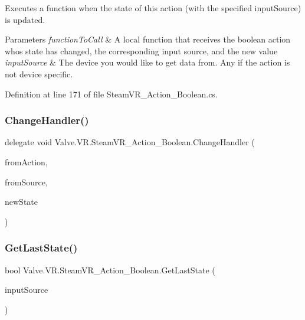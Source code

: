 Executes a function when the state of this action (with the specified input\+Source) is updated. 


\begin{DoxyParams}{Parameters}
{\em function\+To\+Call} & A local function that receives the boolean action who\textquotesingle{}s state has changed, the corresponding input source, and the new value\\
\hline
{\em input\+Source} & The device you would like to get data from. Any if the action is not device specific.\\
\hline
\end{DoxyParams}


Definition at line 171 of file Steam\+V\+R\+\_\+\+Action\+\_\+\+Boolean.\+cs.

\mbox{\label{class_valve_1_1_v_r_1_1_steam_v_r___action___boolean_a9dbdff089d05d822688005fa19fef120}} 
\subsubsection{\texorpdfstring{ChangeHandler()}{ChangeHandler()}}
{\footnotesize\ttfamily delegate void Valve.\+V\+R.\+Steam\+V\+R\+\_\+\+Action\+\_\+\+Boolean.\+Change\+Handler (\begin{DoxyParamCaption}\item[{\mbox{\hyperlink{class_valve_1_1_v_r_1_1_steam_v_r___action___boolean}{Steam\+V\+R\+\_\+\+Action\+\_\+\+Boolean}}}]{from\+Action,  }\item[{\mbox{\hyperlink{namespace_valve_1_1_v_r_a82e5bf501cc3aa155444ee3f0662853f}{Steam\+V\+R\+\_\+\+Input\+\_\+\+Sources}}}]{from\+Source,  }\item[{bool}]{new\+State }\end{DoxyParamCaption})}

\mbox{\label{class_valve_1_1_v_r_1_1_steam_v_r___action___boolean_aac1600cda39d44d405761e63cf268950}} 
\subsubsection{\texorpdfstring{GetLastState()}{GetLastState()}}
{\footnotesize\ttfamily bool Valve.\+V\+R.\+Steam\+V\+R\+\_\+\+Action\+\_\+\+Boolean.\+Get\+Last\+State (\begin{DoxyParamCaption}\item[{\mbox{\hyperlink{namespace_valve_1_1_v_r_a82e5bf501cc3aa155444ee3f0662853f}{Steam\+V\+R\+\_\+\+Input\+\_\+\+Sources}}}]{input\+Source }\end{DoxyParamCaption})}



